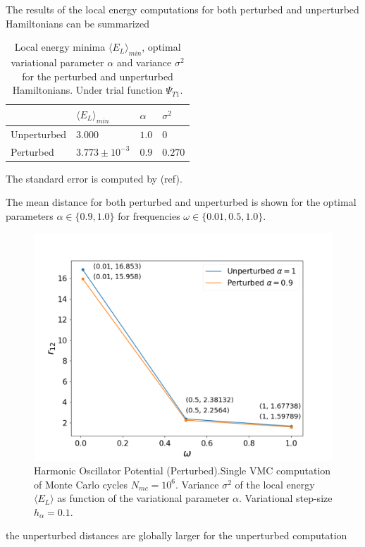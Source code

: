 \documentclass[aip,nobalancelastpage,
twocolumn,
rsi,%
 amsmath,amssymb,
 reprint,%
]{revtex4}
\begin{document}
The results of the local energy computations for both perturbed and unperturbed Hamiltonians can be summarized

\begin{table}[H]
\center
\caption{Local energy minima $\langle E_L \rangle_{min}$, optimal variational parameter $\alpha$ and variance $\sigma^2$ for the perturbed and unperturbed Hamiltonians. Under trial function $\Psi_{T1}$.}
\begin{tabular}{| p{2cm} | p{2cm} | p{2cm} | p{2cm} |}
\hline
 & $\langle E_L \rangle_{min}$ & $\alpha$ & $\sigma^2$\\
\hline
Unperturbed & $3.000$ & $1.0$ & $0$\\
\hline
Perturbed   & $3.773\pm 10^{-3}$ & $0.9$ & $0.270$  \\
\hline
\end{tabular}

\end{table}

The standard error is computed by (ref).\par
The mean distance for both perturbed and unperturbed is shown for the optimal parameters $\alpha \in \{0.9,1.0\}$ for frequencies $\omega \in \{0.01, 0.5, 1.0\}$.

\begin{figure}[H]
\center
\includegraphics[scale=0.35]{figsPartI/IOmegas.png}
\caption{Harmonic Oscillator Potential (Perturbed).\newline Single VMC computation of Monte Carlo cycles $N_{mc}=10^6$. Variance $\sigma^2$ of the local energy $\langle E_L \rangle$ as function of the variational parameter $\alpha$. Variational step-size $h_\alpha = 0.1$.}
\label{Ifig7}
\end{figure}
the unperturbed distances are globally larger for the unperturbed computation
\end{document}
